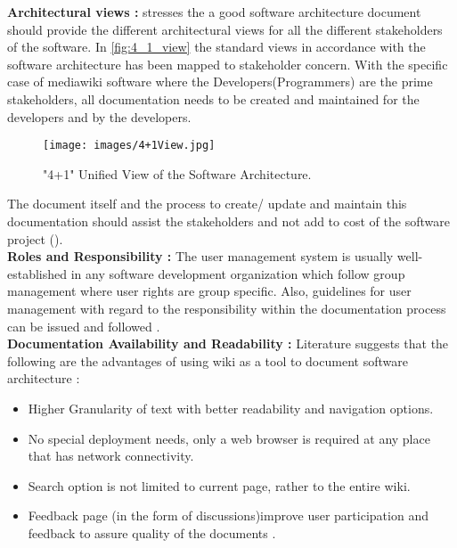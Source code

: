 \newline
\indent \textbf{Architectural views : }\cite{BachmannDocumentingSoftware2010} stresses the a good software architecture document should provide the different architectural views for all the different stakeholders of the software. In \autoref{fig:4_1_view} the standard views in accordance with the software architecture has been mapped to stakeholder concern. With the specific case of mediawiki software where the Developers(Programmers) are the prime stakeholders, all documentation needs to be created and maintained for the developers and by the developers. 
\begin{figure}[H]
  \centering
  \texttt{[image: images/4+1View.jpg]}
  \caption["4+1" Unified View of the Software Architecture \cite{bab2009}]{"4+1" Unified View of the Software Architecture.}\label{fig:4_1_view}
\end{figure}
\indent The document itself and the process to create/ update and maintain this documentation should assist the stakeholders and not add to cost of the software project (\cite{Shahin2014}).
\\\indent \textbf{Roles and Responsibility : }The user management system is usually well-established in any software development organization which follow group management where user rights are group specific. Also, guidelines for user management with regard to the responsibility within the documentation process can be issued and followed \cite{5314237}.
\\\indent \textbf{Documentation Availability and Readability : } Literature suggests that the following are the advantages of using wiki as a tool to document software architecture \cite{Bachmann2005} :
\begin{itemize}
\item Higher Granularity of text with better readability and navigation options.
\item No special deployment needs, only a web browser is required at any place that has network connectivity.
\item Search option is not limited to current page, rather to the entire wiki.
\item Feedback page (in the form of discussions)improve user participation and feedback to assure quality of the documents \cite{Zhao2003}.
\end{itemize}
